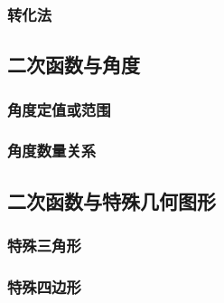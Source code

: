 \subsubsection*{转化法}

\subsection{二次函数与\textbf{角度}}

\subsubsection*{角度定值或范围}

\subsubsection*{角度数量关系}

\subsection{二次函数与\textbf{特殊几何图形}}

\subsubsection*{特殊三角形}

\subsubsection*{特殊四边形}